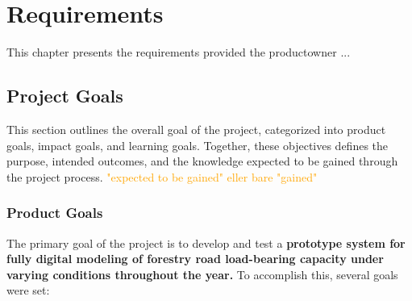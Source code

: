 \chapter{Requirements}\label{chap:requirements}

This chapter presents the requirements provided the \gls{productowner} ...

\section{Project Goals}

This section outlines the overall goal of the project, categorized into product goals, impact goals, and learning goals. Together, these objectives defines the purpose, intended outcomes, and the knowledge expected to be gained through the project process. \textcolor{orange}{"expected to be gained" eller bare "gained"}

\subsection{Product Goals}\label{subsec:req:productgoals}

The primary goal of the project is to develop and test a \textbf{prototype system for fully digital modeling of forestry road load-bearing capacity under varying conditions throughout the year.} To accomplish this, several goals were set:

